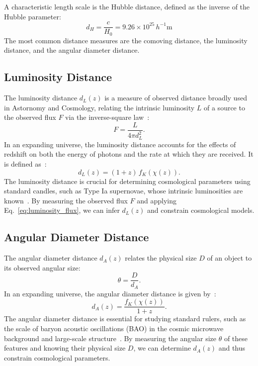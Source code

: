 A characteristic length scale is the Hubble distance, defined as the inverse of the Hubble parameter:
\begin{equation}
    d_H = \frac{c}{H_0} = 9.26 \times 10^{25} \, h^{-1}\text{m} 
    \label{eq:hubble_distance}
\end{equation}
The most common distance measures are the comoving distance, the luminosity distance, and the angular diameter distance.

\subsection{Luminosity Distance}
The luminosity distance \( d_L(z) \) is a measure of observed distance broadly used in Astornomy and Cosmology, relating the intrinsic luminosity \( L \) of a source to the observed flux \( F \) via the inverse-square law~\citep{1992ARA&A..30..499C}:
\begin{equation}
    F = \frac{L}{4\pi d_L^2}.
    \label{eq:luminosity_flux}
\end{equation}
In an expanding universe, the luminosity distance accounts for the effects of redshift on both the energy of photons and the rate at which they are received. It is defined as~\citep{1999astro.ph..5116H}:
\begin{equation}
    d_L(z) = (1 + z) \, f_K(\chi(z)).
    \label{eq:luminosity_distance}
\end{equation}
The luminosity distance is crucial for determining cosmological parameters using standard candles, such as Type Ia supernovae, whose intrinsic luminosities are known~\citep{1998AJ....116.1009R}. By measuring the observed flux \( F \) and applying Eq.~\eqref{eq:luminosity_flux}, we can infer \( d_L(z) \) and constrain cosmological models.

\subsection{Angular Diameter Distance}
The angular diameter distance \( d_A(z) \) relates the physical size \( D \) of an object to its observed angular size:
\begin{equation}
    \theta = \frac{D}{d_A}.
    \label{eq:angular_diameter}
\end{equation}
In an expanding universe, the angular diameter distance is given by~\citep{1999astro.ph..5116H}:
\begin{equation}
    d_A(z) = \frac{f_K(\chi(z))}{1 + z}.
    \label{eq:angular_diameter_distance}
\end{equation}
The angular diameter distance is essential for studying standard rulers, such as the scale of baryon acoustic oscillations (BAO) in the cosmic microwave background and large-scale structure~\citep{2005ApJ...633..560E}. By measuring the angular size \( \theta \) of these features and knowing their physical size \( D \), we can determine \( d_A(z) \) and thus constrain cosmological parameters.

